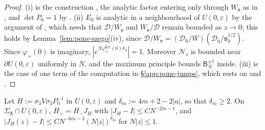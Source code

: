 \begin{proof}
(i) is the construction \cite[(5.10)--(5.24)]{KV}, the analytic factor entering only through $W_{\mathfrak v}$ as in
\cite[\S4.1]{Van}, and $\det P_0=1$ by \cite[(4.53)]{Van}. (ii) $E_0$ is analytic in a neighbourhood of $U(0,\varepsilon)$ by the
argument of \cite[p.~19]{KV}, which needs that $\mathcal D/W_{\mathfrak v}$ and $W_{\mathfrak v}/\mathcal D$ remain bounded as $z\to0$; this holds by
Lemma~\ref{lem:pone-szego}(iv), since $\mathcal D/W_{\mathfrak v}=(\mathcal D_{\mathrm h}/W)(\mathcal D_{\mathrm q}/\mathfrak v_0^{1/2})$. Since $\varphi_+(0)$ is
imaginary, $|e^{N\varphi^{\mathrm{KV}}_+(0)\sigma_3}|=1$. Moreover $\mathcal N_s$ is bounded near $\partial U(0,\varepsilon)$ uniformly in $N$,
and the maximum principle bounds $\mathsf B_N^{\pm1}$ inside. (iii) is the case of one term of the computation in
\S\ref{app:pone-jumps}, which rests on \cite[(4.43)--(4.46)]{Van} and \cite[(5.26)]{KV}.
\end{proof}

\begin{lemma}\label{lem:pone-mismatch}
Let $H:=\sigma_3V\sigma_3P_0^{-1}$ in $U(0,\varepsilon)$ and $\delta_m:=4m+2-2|a|$, so that $\delta_m\ge2$. On
$\Sigma_{\mathsf X}\cap U(0,\varepsilon)$, $H_+=H_-J_H$ with $|J_H-I|\le CN^{-2m-1}$, and $|J_H(z)-I|\le CN^{-6m-3}(N|z|)^{\delta_m}$
for $N|z|\le1$.
\end{lemma}

